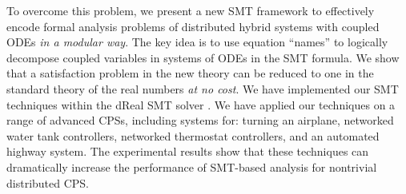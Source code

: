 

To overcome this problem, we present a new SMT framework
to  effectively encode formal analysis problems
of distributed hybrid systems with coupled ODEs \emph{in a modular
  way}.
The key idea is to use equation ``names'' %
to logically decompose coupled variables in systems of ODEs in the SMT formula.
We show that 
a satisfaction problem in  the new  theory 
can be reduced to one in the standard theory of the real numbers \emph{at no cost}.
%
We have implemented our SMT techniques within the \textsf{dReal} SMT
solver \cite{dReal}.
We have applied our techniques on a range of advanced CPSs, including
systems for: turning an airplane, 
 networked water tank
 controllers,  networked thermostat controllers, and
an automated highway system.
The experimental results show that these techniques can dramatically increase 
the performance of SMT-based analysis for nontrivial distributed CPS.

